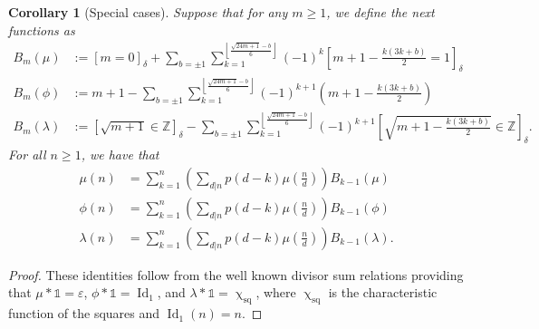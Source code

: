 \documentclass[12pt,reqno,a4letter]{article}
\numberwithin{figure}{section}
\numberwithin{table}{section}
\numberwithin{equation}{section}
\newcommand{\Iverson}[1]{\ensuremath{\left[#1\right]_{\delta}}}
\renewcommand{\chi}{\upchi}
\theoremstyle{plain}
\newtheorem{cor}[theorem]{Corollary}
\numberwithin{theorem}{section}
\theoremstyle{definition}
\begin{document}
\begin{cor}[Special cases]
Suppose that for any $m \geq 1$, we define the next functions as 
\begin{align*} 
B_m(\mu) & := \Iverson{m = 0} + \sum_{b = \pm 1} 
     \sum_{k=1}^{\left\lfloor \frac{\sqrt{24m+1}-b}{6} \right\rfloor} 
     (-1)^k \Iverson{m+1-\frac{k(3k+b)}{2} = 1} \\ 
B_m(\phi) & := m+1 - 
     \sum_{b = \pm 1} 
     \sum_{k=1}^{\left\lfloor \frac{\sqrt{24m+1}-b}{6} \right\rfloor} 
     (-1)^{k+1} \left(m+1-\frac{k(3k+b)}{2}\right) \\ 
B_m(\lambda) & := \Iverson{\sqrt{m+1} \in \mathbb{Z}} - 
     \sum_{b = \pm 1} 
     \sum_{k=1}^{\left\lfloor \frac{\sqrt{24m+1}-b}{6} \right\rfloor} 
     (-1)^{k+1} \Iverson{\sqrt{m+1-\frac{k(3k+b)}{2}} \in \mathbb{Z}}. 
\end{align*}
For all $n \geq 1$, we have that 
\begin{align*} 
\mu(n) & = \sum_{k=1}^n \left(\sum_{d|n} p(d-k) \mu\left(\frac{n}{d}\right)\right) B_{k-1}(\mu) \\ 
\phi(n) & = \sum_{k=1}^n \left(\sum_{d|n} p(d-k) \mu\left(\frac{n}{d}\right)\right) B_{k-1}(\phi) \\ 
\lambda(n) & = \sum_{k=1}^n \left(\sum_{d|n} p(d-k) \mu\left(\frac{n}{d}\right)\right) B_{k-1}(\lambda). 
\end{align*}
\end{cor}
\begin{proof}
These identities follow from the well known divisor sum relations providing that 
$\mu \ast \mathds{1} = \varepsilon$, $\phi \ast \mathds{1} = \operatorname{Id}_1$, and 
$\lambda \ast \mathds{1} = \chi_{\operatorname{sq}}$, where 
$\chi_{\operatorname{sq}}$ is the characteristic function of the squares and 
$\operatorname{Id}_1(n) = n$. 
\end{proof}
\end{document}

